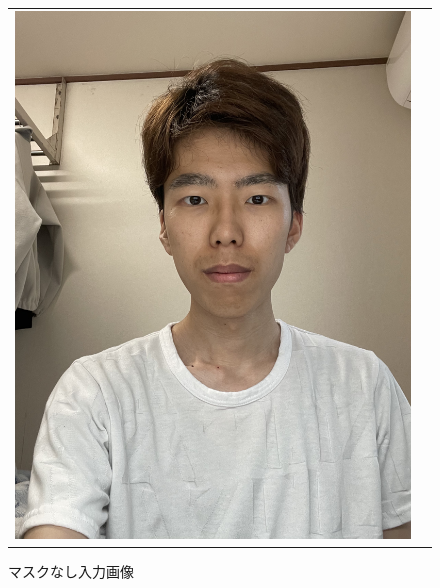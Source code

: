 \documentclass[]{jarticle}          %
\begin{document}
\begin{figure}[!ht]
\begin{tabular}{cc}
\begin{minipage}[t]{0.45\hsize}
      \includegraphics[keepaspectratio, scale=0.1]{figures/nomask.jpg}
      \caption{マスクなし入力画像}
      \label{three}
    \end{minipage}
  \end{tabular}
\end{figure}
\\
\end{document}
